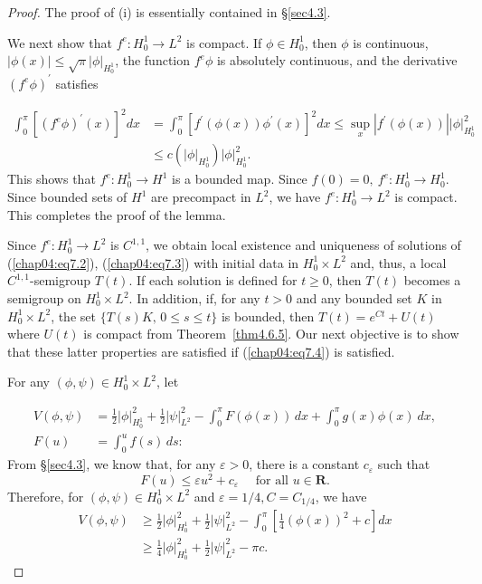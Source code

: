 \documentclass{surv-l}
\theoremstyle{plain}
\theoremstyle{definition}
\numberwithin{equation}{section}
\numberwithin{figure}{chapter}
\begin{document}
\begin{proof}
The proof of (i) is essentially contained in \S \ref{sec4.3}.

We next show that $f^{e}\!:H_{0}^{1}\rightarrow L^{2}$ is compact. If $\phi \in H_{0}^{1}$, then $\phi$ is continuous, $|\phi(x)|\leq\sqrt{\pi}|\phi|_{H_{0}^{1}}$, the function $ f^{e}\phi$ is absolutely continuous, and the derivative $(f^{e}\phi)^{\prime}$ satisfies

\begin{align*}
\int_{0}^{\pi}[(f^{e}\phi)^{\prime}(x)]^{2}dx&=\int_{0}^{\pi}[f^{\prime}(\phi(x))\phi^{\prime}(x)]^{2}dx\leq\sup_{x}|f^{\prime}
(\phi(x))||\phi|_{H_{0}^{1}}^{2}\\
&\leq c(|\phi|_{H_{0}^{1}})|\phi|_{H_{0}^{1}}^{2}.
\end{align*}
This shows that $f^{e}\!:H_{0}^{1}\rightarrow H^{1}$ is a bounded map. Since $f(0)=0,\ f^{e}\!:H_{0}^{1}\rightarrow H_{0}^{1}$. Since bounded sets of $H^{1}$ are precompact in $L^{2}$, we have $f^{e}\!:H_{0}^{1}\rightarrow L^{2}$ is compact. This completes the proof of the lemma.

Since $f^{e}\!:H_{0}^{1}\rightarrow L^{2}$ is $C^{1,1}$, we obtain local existence and uniqueness of solutions of (\ref{chap04:eq7.2}), (\ref{chap04:eq7.3}) with initial data in $H_{0}^{1}\times L^{2}$ and, thus, a local $C^{1,1}$-semigroup $T(t)$. If each solution is defined for $t\geq 0$, then $T(t)$ becomes a semigroup on $H_{0}^{1} \times L^{2}$. In addition, if, for any $t>0$ and any bounded set $K$ in $H_{0}^{1}\times L^{2}$, the set $\{T(s)K,\, 0\leq s\leq t\}$ is bounded, then $T(t)=e^{Ct}+U(t)$ where $U(t)$ is compact from Theorem~\ref{thm4.6.5}. Our next objective is to show that these latter properties are satisfied if (\ref{chap04:eq7.4}) is satisfied.

For any $(\phi, \psi)\in H_{0}^{1}\times L^{2}$, let

\begin{equation}\label{chap04:eq7.9}
\begin{split}
V(\phi, \psi)&=\frac{1}{2}|\phi|_{H_{0}^{1}}^{2}+\frac{1}{2}|\psi|_{L^{2}}^{2}-\int_{0}^{\pi}F(\phi(x))\,dx+\int_{0}^{\pi}g(x)\phi(x)\ dx,\\
F(u)&=\int_{0}^{u}f(s)\,ds:
\end{split}
\end{equation}
From \S \ref{sec4.3}, we know that, for any $\varepsilon >0$, there is a constant $c_{\varepsilon}$ such that
\begin{equation*}
F(u)\leq\varepsilon u^{2}+c_{\varepsilon} \quad \text{ for  all } u\in \mathbf{R}.
\end{equation*}
Therefore, for $(\phi, \psi)\in H_{0}^{1}\times L^{2}$ and $\varepsilon =1/4, C=C_{1/4}$, we have
\begin{equation}\label{chap04:eq7.10}
\begin{split}
V(\phi,\psi)&\geq\frac{1}{2}|\phi|_{H_{0}^{1}}^{2}+\frac{1}{2}|\psi|_{L^{2}}^{2}-\int_{0}^{\pi}\left[\frac{1}{4}(\phi(x))^{2}+c\right]dx\\
&\geq\frac{1}{4}|\phi|_{H_{0}^{1}}^{2}+\frac{1}{2}|\psi|_{L^{2}}^{2}-\pi c.
\end{split}
\end{equation}


\end{proof}
\end{document}
